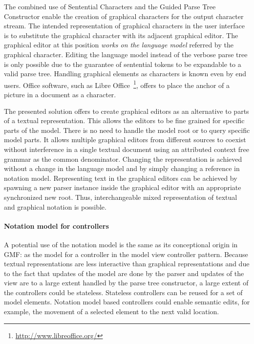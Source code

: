 The combined use of Sentential Characters and the Guided Parse Tree Constructor enable the creation of graphical characters for the output character stream. The intended representation of graphical characters in the user interface is to substitute the graphical character with its adjacent graphical editor. The graphical editor at this position \emph{works on the language model} referred by the graphical character. Editing the language model instead of the verbose parse tree is only possible due to the guarantee of sentential tokens to be expandable to a valid parse tree. Handling graphical elements as characters is known even by end users. Office software, such as Libre Office~\footnote{\raggedright \url{http://www.libreoffice.org/}}, offers to place the anchor of a picture in a document as a character.

The presented solution offers to create graphical editors as an alternative to parts of a textual representation. This allows the editors to be fine grained for specific parts of the model. There is no need to handle the model root or to query specific model parts. It allows multiple graphical editors from different sources to coexist without interference in a single textual document using an attributed context free grammar as the common denominator. Changing the representation is achieved without a change in the language model and by simply changing a reference in notation model. Representing text in the graphical editors can be achieved by spawning a new parser instance inside the graphical editor with an appropriate synchronized new root. Thus, interchangeable mixed representation of textual and graphical notation is possible.

\paragraph{Notation model for controllers} A potential use of the notation model is the same as its conceptional origin in GMF: as the model for a controller in the model view controller pattern. Because textual representations are less interactive than graphical representations and due to the fact that updates of the model are done by the parser and updates of the view are to a large extent handled by the parse tree constructor, a large extent of the controllers could be stateless. Stateless controllers can be reused for a set of model elements. Notation model based controllers could enable semantic edits, for example, the movement of a selected element to the next valid location. 




